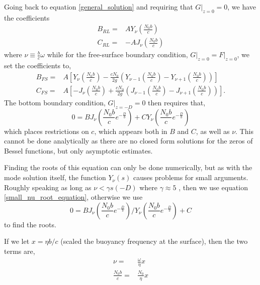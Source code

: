 \documentclass[11pt]{article}
\begin{document}
Going back to equation \ref{general_solution} and requiring that $G\rvert_{z=0}=0$, we have the coefficients
\begin{align}
B_{RL} =& A Y_\nu \left(\frac{N_0 b}{c}\right)\\
 C_{RL} =& - A J_\nu\left(\frac{N_0 b}{c}\right)
\end{align}
where $\nu \equiv \frac{b}{c} \omega$ while for the free-surface boundary condition, $G\rvert_{z=0}=F\rvert_{z=0}$, we set the coefficients to,
\begin{align}
B_{FS} =& A \left[Y_{\nu} \left(\frac{N_0 b}{c}\right) - \frac{c N_0}{2 g } \left(Y_{\nu-1} \left(\frac{N_0 b}{c}\right) - Y_{\nu+1} \left(\frac{N_0 b}{c}\right) \right) \right] \\
C_{FS} =& A \left[-J_{\nu} \left(\frac{N_0 b}{c}\right) +  \frac{c N_0}{2 g } \left( J_{\nu-1} \left(\frac{N_0 b}{c}\right) - J_{\nu+1} \left(\frac{N_0 b}{c}\right) \right) \right].
\end{align}
The bottom boundary condition, $G\rvert_{z=-D}=0$ then requires that,
\begin{equation}
\label{small_nu_root_equation}
0 = B J_{\nu} \left(\frac{N_0 b}{c}e^{-\frac{D}{b}} \right) + C Y_{\nu} \left(\frac{N_0 b}{c}e^{-\frac{D}{b}} \right)
\end{equation}
which places restrictions on $c$, which appears both in $B$ and $C$, as well as $\nu$. This cannot be done analytically as there are no closed form solutions for the zeros of Bessel functions, but only asymptotic estimates.

Finding the roots of this equation can only be done numerically, but as with the mode solution itself, the function $Y_\nu(s)$ causes problems for small arguments. Roughly speaking as long as $\nu < \gamma s(-D)$ where $\gamma \approx 5$ , then we use equation \ref{small_nu_root_equation}, otherwise we use
\begin{equation}
\label{big_nu_root_equation}
0 = B J_{\nu} \left(\frac{N_0 b}{c}e^{-\frac{D}{b}} \right) / Y_{\nu} \left(\frac{N_0 b}{c}e^{-\frac{D}{b}} \right) + C 
\end{equation}
to find the roots.

If we let $x=\eta b/c$ (scaled the buoyancy frequency at the surface), then the two terms are,
\begin{align}
\nu =& \frac{\omega}{\eta} x \\
\frac{N_0 b}{c} =& \frac{N_0}{\eta} x
\end{align}

\end{document}
